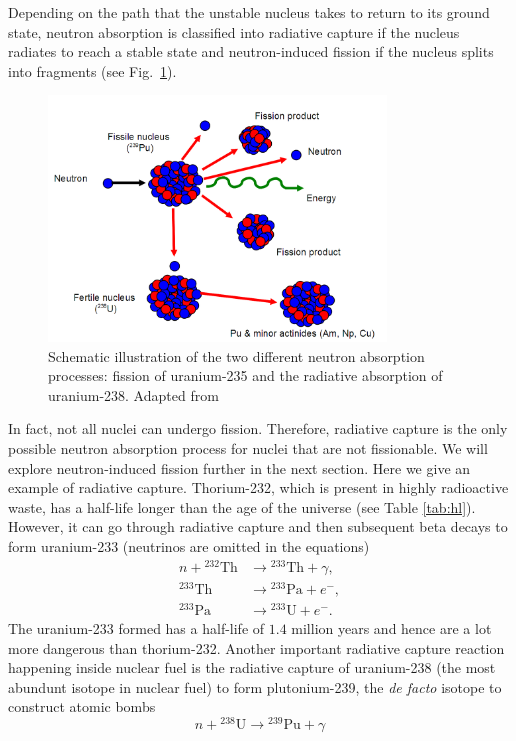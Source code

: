 \documentclass[nofootinbib,preprint,aps]{revtex4-1}
\begin{document}
    Depending on the path that the unstable nucleus takes to return to its ground
    state, neutron absorption is classified into radiative capture if the nucleus radiates to reach a stable
    state and neutron-induced fission if the nucleus splits into fragments (see Fig.~\ref{fig:both}).
        \begin{figure}[h]
            \centering
            \includegraphics[width=0.8\textwidth]{pu.png}
            \caption{Schematic illustration of the two different neutron absorption processes:
            fission of uranium-235 and the radiative absorption of uranium-238. Adapted from \cite{iync_2013}}
            \label{fig:both}
        \end{figure}
    In fact, not all nuclei can undergo fission.
    Therefore, radiative capture is the only possible neutron absorption process for
    nuclei that are not fissionable.\cite{lb01} We will explore neutron-induced fission further in
    the next section. Here we give an example of radiative capture. Thorium-232, which is present in highly radioactive
    waste, has a half-life longer than the age of the universe (see Table \ref{tab:hl}). However, it can go through
    radiative capture and then subsequent beta decays to form uranium-233 (neutrinos are omitted in the equations)
    \begin{align}
        n + {}^{232}\text{Th} &\rightarrow {}^{233}\text{Th} + \gamma,\\
        {}^{233}\text{Th} &\rightarrow {}^{233}\text{Pa} + e^-,\\
        {}^{233}\text{Pa} &\rightarrow {}^{233}\text{U} + e^-.
    \end{align}
    The uranium-233 formed has a half-life of $1.4$ million years and hence are a lot more dangerous than
    thorium-232. Another important radiative capture reaction happening inside nuclear fuel is the radiative
    capture of uranium-238 (the most abundunt isotope in nuclear fuel) to form plutonium-239, the {\it de facto}
    isotope to construct atomic bombs
    \begin{equation}
        n + {}^{238}\text{U} \rightarrow {}^{239}\text{Pu} + \gamma
    \end{equation}
\end{document}
